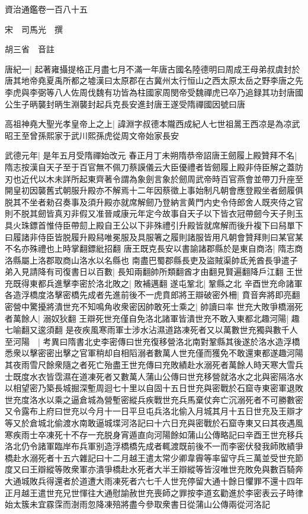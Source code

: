 資治通鑑卷一百八十五

宋　司馬光　撰

胡三省　音註

唐紀一|{
	起著雍攝提格正月盡七月不滿一年唐古國名陸德明曰周成王母弟叔虞封於唐其地帝堯夏禹所都之墟漢曰太原郡在古冀州太行恒山之西太原太岳之野李唐之先李虎與李弼等八人佐周伐魏有功皆為柱國家周閔帝受魏禪虎已卒乃追録其功封唐國公生子昞襲封昞生淵襲封起兵克長安進封唐王遂受隋禪國因號曰唐}


高祖神堯大聖光孝皇帝上之上|{
	諱淵字叔德本隴西成紀人七世祖暠王西凉是為凉武昭王至曾孫熙家于武川熙孫虎從周文帝始家長安}


武德元年|{
	是年五月受隋禪始改元}
春正月丁未朔隋恭帝詔唐王劒履上殿贊拜不名|{
	隋志按漢自天子至于百官無不佩刀蔡謨儀云大臣優禮者皆劒履上殿非侍臣解之蓋防刃也近代以木未詳所起東齊著令謂為象劍言象於劒周武帝時百官燕會並帶刀升座至開皇初因襲舊式朝服升殿亦不解焉十二年因蔡徵上事始制凡朝會應登殿坐者劒履俱脱其不坐者勑召奏事及須升殿亦就席解劒乃登納言黄門内史令侍郎舍人既夾侍之官則不脱其劒皆真刃非假又准晉咸康元年定今故事自天子以下皆衣冠帶劒今天子則玉具火珠鏢首惟侍臣帶劎上殿自王公以下非殊禮引升殿皆就席解而後升複下曰舄單下曰履諸非侍臣皆脱履升殿舄唯冕服及具服箸之履則諸服皆用凡朝會贊拜則曰某官某不名亦殊禮也上時掌翻鏢紕招翻}
唐王既克長安以書諭諸郡縣於是東自商洛|{
	隋志商洛縣屬上洛郡取商山洛水以名縣也}
南盡巴蜀郡縣長吏及盜賊渠帥氐羌酋長爭遣子弟入見請降有司復書日以百數|{
	長知兩翻帥所類翻酋才由翻見賢遍翻降戶江翻}
王世充既得東都兵進擊李密於洛北敗之|{
	敗補邁翻}
遂屯鞏北|{
	鞏縣之北}
辛酉世充命諸軍各造浮橋度洛擊密橋先成者先進前後不一虎賁郎將王辯破密外柵|{
	賁音奔將即亮翻}
密營中驚擾將潰世充不知鳴角收衆密因帥敢死士乘之|{
	帥讀曰率}
世充大敗爭橋溺死者萬餘人|{
	溺奴狄翻}
王辯死世充僅自免洛北諸軍皆潰世充不敢入東都北趣河陽|{
	趣七喻翻又逡須翻}
是夜疾風寒雨軍士涉水沾濕道路凍死者又以萬數世充獨與數千人至河陽　|{
	考異曰隋書北史李密傳曰世充復移營洛北南對鞏縣其後遂於洛水造浮橋悉衆以擊密密出擊之官軍稍却自相䧟溺者數萬人世充僅而獲免不敢還東都遂趣河陽其夜雨雪尺餘衆隨之者死亡殆盡王世充傳曰充敗績赴水溺死者萬餘人時天寒大雪兵士既度水衣皆霑濕在道凍死者又數萬人蒲山公傳曰世充移營就洛水之北與密隔洛水以相望密乃築長城掘深塹周迴七十里以自固十五日世充與密戰於石窟寺東密軍退敗世充度洛水以乘之逼倉城為營塹密縱兵疾戰世充兵馬棄仗奔亡沉溺死者不可勝數密又令露布上府曰世充以今月十一日平旦屯兵洛北偷入月城其月十五日世充及王辯才等又於倉城北偷渡水南敢逼城堞河洛記曰十六日充與密戰於石窟寺東又曰其夜遇風寒疾雨士卒凍死十不存一充脱身宵遁直向河陽餘如蒲山公傳略記曰辛酉王世充移兵洛北仍令諸軍臨岸布兵軍别造浮橋橋先成者輒渡既前後不一而李密伏發我師敗績爭橋赴水溺死者十五六雜記曰十二月越王遣太常少卿韋霽等率留守兵三萬並受世充節度又曰王辯縱等敗衆軍亦潰爭橋赴水死者大半王辯縱等皆沒唯世充敗免與數百騎奔大通城敗兵得還者於道遭大雨凍死者六七千人世充停留大通十餘日懼罪不還十四年正月越王遣世充兄世惲往大通慰諭赦世充喪師之罪按李道玄勸進於李密表云子時律始太簇未宜霡霂而澍雨忽降凍殕將盡今參取衆書日從蒲山公傳兩從河洛記}
